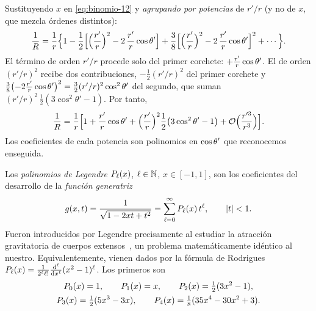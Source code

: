 Sustituyendo $x$ en \cref{eq:binomio-12} y \emph{agrupando por potencias} de $r'/r$ (y no de $x$, que mezcla órdenes distintos):
\[
  \frac{1}{R}=\frac{1}{r}\Bigl\{1-\frac{1}{2}\Bigl[\Bigl(\frac{r'}{r}\Bigr)^{2}-2\,\frac{r'}{r}\cos\theta'\Bigr]
  +\frac{3}{8}\Bigl[\Bigl(\frac{r'}{r}\Bigr)^{2}-2\,\frac{r'}{r}\cos\theta'\Bigr]^{2}+\cdots\Bigr\}.
\]
El término de orden $r'/r$ procede solo del primer corchete: $+\frac{r'}{r}\cos\theta'$. El de orden $(r'/r)^{2}$ recibe dos contribuciones, $-\frac12(r'/r)^{2}$
del primer corchete y $\frac38\bigl(-2\frac{r'}{r}\cos\theta'\bigr)^{2}=\frac32(r'/r)^{2}\cos^{2}\theta'$ del segundo, que suman
$(r'/r)^{2}\,\frac12(3\cos^{2}\theta'-1)$. Por tanto,
\begin{equation}\label{eq:1R-orden2}
  \frac{1}{R}=\frac{1}{r}\Bigl[1+\frac{r'}{r}\cos\theta'+\Bigl(\frac{r'}{r}\Bigr)^{2}\frac{1}{2}\bigl(3\cos^{2}\theta'-1\bigr)+\mathcal{O}\Bigl(\frac{r'^{3}}{r^{3}}\Bigr)\Bigr].
\end{equation}
Los coeficientes de cada potencia son polinomios en $\cos\theta'$ que reconocemos enseguida.

\begin{definicion}\label{def:legendre}
Los \emph{polinomios de Legendre} $P_{\ell}(x)$, $\ell\in\mathbb{N}$, $x\in[-1,1]$, son los coeficientes del desarrollo de la \emph{función generatriz}
\begin{equation}\label{eq:generatriz}
  g(x,t)=\frac{1}{\sqrt{1-2xt+t^{2}}}=\sum_{\ell=0}^{\infty}P_{\ell}(x)\,t^{\ell},\qquad \lvert t\rvert<1 .
\end{equation}
Fueron introducidos por Legendre precisamente al estudiar la atracción gravitatoria de cuerpos extensos~\cite{LEGENDRE}, un problema matemáticamente idéntico al nuestro.
Equivalentemente, vienen dados por la fórmula de Rodrigues $P_{\ell}(x)=\frac{1}{2^{\ell}\ell!}\frac{\mathrm{d}^{\ell}}{\mathrm{d} x^{\ell}}(x^{2}-1)^{\ell}$. Los primeros son
\begin{equation}\label{eq:legendre}
  \begin{gathered}
  P_{0}(x)=1,\qquad P_{1}(x)=x,\qquad P_{2}(x)=\tfrac12(3x^{2}-1),\\
  P_{3}(x)=\tfrac12(5x^{3}-3x),\qquad P_{4}(x)=\tfrac18(35x^{4}-30x^{2}+3).
  \end{gathered}
\end{equation}
\end{definicion}


